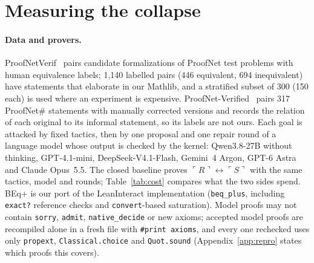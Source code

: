 \documentclass[10pt]{article}
\theoremstyle{definition}
\newcommand{\Cl}[1]{\ulcorner #1 \urcorner}
\begin{document}
\section{Measuring the collapse}\label{sec:measure}

\paragraph{Data and provers.} ProofNetVerif~\cite{proofnetverif} pairs candidate formalizations of
ProofNet test problems with human equivalence labels; 1,140 labelled pairs (446 equivalent, 694
inequivalent) have statements that elaborate in our Mathlib, and a stratified subset of 300 (150
each) is used where an experiment is expensive. ProofNet-Verified~\cite{pnv} pairs 317 ProofNet\#
statements with manually corrected versions and records the relation of each original to its
informal statement, so its labels are not ours. Each goal is attacked by fixed tactics, then by
one proposal and one repair round of a language model whose output is checked by the kernel:
Qwen3.8-27B without thinking, GPT-4.1-mini, DeepSeek-V4.1-Flash, Gemini~4 Argon, GPT-6 Astra and
Claude Opus~5.5. The closed baseline proves $\Cl R\leftrightarrow\Cl S$ with the same tactics, model
and rounds; Table~\ref{tab:cost} compares what the two sides spend. BEq+ is our port of the LeanInteract implementation (\texttt{beq\_plus}, including
\texttt{exact?} reference checks and \texttt{convert}-based saturation). Model proofs may not
contain \texttt{sorry}, \texttt{admit}, \texttt{native\_decide} or new axioms; accepted model
proofs are recompiled alone in a fresh file with \texttt{\#print axioms}, and every one rechecked
uses only \texttt{propext}, \texttt{Classical.choice} and \texttt{Quot.sound}
(Appendix~\ref{app:repro} states which proofs this covers).
\end{document}

